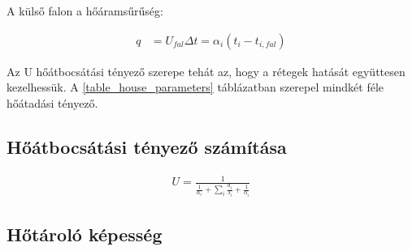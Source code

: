 A külső falon a hőáramsűrűség:

\begin{equation}\label{eq_hoveszteseg}
\begin{aligned}
q &= U_{fal}\Delta t = \alpha_i\left(t_i-t_{i,fal}\right)
\end{aligned}
\end{equation}

Az U hőátbocsátási tényező szerepe tehát az, hogy a rétegek hatását együttesen kezelhessük. A \ref{table_house_parameters} táblázatban szerepel mindkét féle hőátadási tényező. 



\begin{table}[t]
	\footnotesize
	\centering
	\caption{Hőközlés fajtái}
	
	\label{tab:HeatExchangeTypes}
\end{table}
 


 
 
 
 
 

\subsection*{Hőátbocsátási tényező számítása}


\begin{equation}\label{eq_hoatbcsatas_U}
\begin{aligned}
U = \frac{1}{\frac{1}{\alpha_e}+\sum\limits_{i}^{}\frac{d_i}{\lambda_i}+\frac{1}{\alpha_i}}
\end{aligned}
\end{equation}



\subsection*{Hőtároló képesség}


